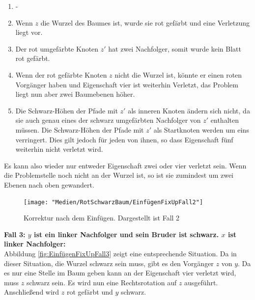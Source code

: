 \documentclass[a4paper,12pt]{article}
\begin{document}
\begin{enumerate}
	\item -
	\item Wenn $z$ die Wurzel des Baumes ist, wurde sie rot gefärbt und eine Verletzung liegt vor.
	\item Der rot umgefärbte Knoten $z'$ hat zwei Nachfolger, somit wurde kein Blatt rot gefärbt.
	\item  Wenn der rot gefärbte Knoten $z$ nicht die Wurzel ist, könnte er einen roten Vorgänger haben und Eigenschaft vier ist weiterhin Verletzt, das Problem liegt nun aber zwei Baumebenen höher.
	\item  Die Schwarz-Höhen der Pfade mit $z'$ als inneren Knoten ändern sich nicht, da sie auch genau eines der schwarz umgefärbten Nachfolger von $z'$ enthalten müssen. Die Schwarz-Höhen der Pfade mit $z'$ als Startknoten werden um eins verringert. Dies gilt jedoch für jeden von ihnen, so dass Eigenschaft fünf weiterhin nicht verletzt wird.
\end{enumerate} 
Es kann also wieder nur entweder Eigenschaft zwei oder vier verletzt sein. Wenn die Problemstelle noch nicht an der Wurzel ist, so ist sie zumindest um zwei Ebenen nach oben gewandert. 
\begin{figure}[h]
	\centering
	\texttt{[image: "Medien/RotSchwarzBaum/EinfügenFixUpFall2"]}
	\caption{Korrektur nach dem Einfügen. Dargestellt ist Fall 2  }
	\label{fig:EinfügenFixUpFall2}
\end{figure}

\noindent\textbf{Fall 3: $y$ ist ein linker Nachfolger und sein Bruder ist schwarz. $x$ ist linker Nachfolger: }\\
\noindent Abbildung \ref{fig:EinfügenFixUpFall3} zeigt eine entsprechende Situation. Da in dieser Situation, die Wurzel schwarz sein muss, gibt es den Vorgänger $z$ von $y$. Da es nur eine Stelle im Baum geben kann an der Eigenschaft vier verletzt wird, muss $z$ schwarz sein. Es wird nun eine Rechtsrotation auf $z$ ausgeführt. Anschließend wird $z$ rot gefärbt und $y$ schwarz. \\
\end{document}
